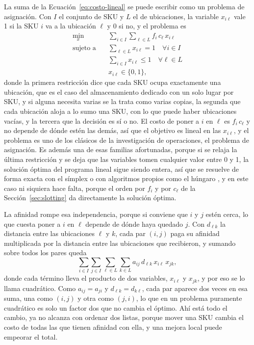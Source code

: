 La suma de la Ecuación~\ref{eq:costo-lineal} se puede escribir como un problema de asignación.
Con $I$ el conjunto de SKU y $L$ el de ubicaciones, la variable $x_{i\ell}$ vale 1 si la SKU $i$ va a la ubicación $\ell$ y 0 si no, y el problema es
\begin{equation}
    \begin{aligned}
        \min_{x} \quad & \sum_{i \in I} \sum_{\ell \in L} f_i\, c_\ell\, x_{i\ell} \\
        \text{sujeto a} \quad & \sum_{\ell \in L} x_{i\ell} = 1 \quad \forall i \in I \\
        & \sum_{i \in I} x_{i\ell} \le 1 \quad \forall \ell \in L \\
        & x_{i\ell} \in \{0, 1\},
    \end{aligned}
    \label{eq:asignacion-lineal}
\end{equation}
donde la primera restricción dice que cada SKU ocupa exactamente una ubicación, que es el caso del almacenamiento dedicado con un solo lugar por SKU, y si alguna necesita varias se la trata como varias copias, la segunda que cada ubicación aloja a lo sumo una SKU, con lo que puede haber ubicaciones vacías, y la tercera que la decisión es sí o no.
El costo de poner a $i$ en $\ell$ es $f_i\, c_\ell$ y no depende de dónde estén las demás, así que el objetivo es lineal en las $x_{i\ell}$, y el problema es uno de los clásicos de la investigación de operaciones, el problema de asignación.
Es además una de esas familias afortunadas, porque si se relaja la última restricción y se deja que las variables tomen cualquier valor entre 0 y 1, la solución óptima del programa lineal sigue siendo entera, así que se resuelve de forma exacta con el símplex o con algoritmos propios como el húngaro \citep{kuhn1955hungarian}, y en este caso ni siquiera hace falta, porque el orden por $f_i$ y por $c_\ell$ de la Sección~\ref{sec:slotting} da directamente la solución óptima.

La afinidad rompe esa independencia, porque si conviene que $i$ y $j$ estén cerca, lo que cuesta poner a $i$ en $\ell$ depende de dónde haya quedado $j$.
Con $d_{\ell k}$ la distancia entre las ubicaciones $\ell$ y $k$, cada par $(i, j)$ paga su afinidad multiplicada por la distancia entre las ubicaciones que recibieron, y sumando sobre todos los pares queda
\begin{equation}
    \sum_{i \in I} \sum_{j \in I} \sum_{\ell \in L} \sum_{k \in L} a_{ij}\, d_{\ell k}\, x_{i\ell}\, x_{jk},
    \label{eq:termino-cuadratico}
\end{equation}
donde cada término lleva el producto de dos variables, $x_{i\ell}$ y $x_{jk}$, y por eso se lo llama cuadrático.
Como $a_{ij} = a_{ji}$ y $d_{\ell k} = d_{k \ell}$, cada par aparece dos veces en esa suma, una como $(i, j)$ y otra como $(j, i)$, lo que en un problema puramente cuadrático es solo un factor dos que no cambia el óptimo.
Ahí está todo el cambio, ya no alcanza con ordenar dos listas, porque mover una SKU cambia el costo de todas las que tienen afinidad con ella, y una mejora local puede empeorar el total.

